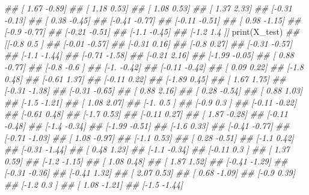 \documentclass[
]{book}
\newenvironment{Shaded}{\begin{snugshade}}{\end{snugshade}}
\newcommand{\BuiltInTok}[1]{#1}
\newcommand{\CommentTok}[1]{\textcolor[rgb]{0.56,0.35,0.01}{\textit{#1}}}
\newcommand{\NormalTok}[1]{#1}
\theoremstyle{definition}
\theoremstyle{definition}
\theoremstyle{definition}
\theoremstyle{definition}
\theoremstyle{remark}
\begin{document}
\begin{Shaded}
\begin{Highlighting}[]
\CommentTok{\#\#  [ 1.67 {-}0.89]}
\CommentTok{\#\#  [ 1.18  0.53]}
\CommentTok{\#\#  [ 1.08  0.53]}
\CommentTok{\#\#  [ 1.37  2.33]}
\CommentTok{\#\#  [{-}0.31 {-}0.13]}
\CommentTok{\#\#  [ 0.38 {-}0.45]}
\CommentTok{\#\#  [{-}0.41 {-}0.77]}
\CommentTok{\#\#  [{-}0.11 {-}0.51]}
\CommentTok{\#\#  [ 0.98 {-}1.15]}
\CommentTok{\#\#  [{-}0.9  {-}0.77]}
\CommentTok{\#\#  [{-}0.21 {-}0.51]}
\CommentTok{\#\#  [{-}1.1  {-}0.45]}
\CommentTok{\#\#  [{-}1.2   1.4 ]]}
\BuiltInTok{print}\NormalTok{(X\_test)}
\CommentTok{\#\# [[{-}0.8   0.5 ]}
\CommentTok{\#\#  [{-}0.01 {-}0.57]}
\CommentTok{\#\#  [{-}0.31  0.16]}
\CommentTok{\#\#  [{-}0.8   0.27]}
\CommentTok{\#\#  [{-}0.31 {-}0.57]}
\CommentTok{\#\#  [{-}1.1  {-}1.44]}
\CommentTok{\#\#  [{-}0.71 {-}1.58]}
\CommentTok{\#\#  [{-}0.21  2.16]}
\CommentTok{\#\#  [{-}1.99 {-}0.05]}
\CommentTok{\#\#  [ 0.88 {-}0.77]}
\CommentTok{\#\#  [{-}0.8  {-}0.6 ]}
\CommentTok{\#\#  [{-}1.   {-}0.42]}
\CommentTok{\#\#  [{-}0.11 {-}0.42]}
\CommentTok{\#\#  [ 0.09  0.22]}
\CommentTok{\#\#  [{-}1.8   0.48]}
\CommentTok{\#\#  [{-}0.61  1.37]}
\CommentTok{\#\#  [{-}0.11  0.22]}
\CommentTok{\#\#  [{-}1.89  0.45]}
\CommentTok{\#\#  [ 1.67  1.75]}
\CommentTok{\#\#  [{-}0.31 {-}1.38]}
\CommentTok{\#\#  [{-}0.31 {-}0.65]}
\CommentTok{\#\#  [ 0.88  2.16]}
\CommentTok{\#\#  [ 0.28 {-}0.54]}
\CommentTok{\#\#  [ 0.88  1.03]}
\CommentTok{\#\#  [{-}1.5  {-}1.21]}
\CommentTok{\#\#  [ 1.08  2.07]}
\CommentTok{\#\#  [{-}1.    0.5 ]}
\CommentTok{\#\#  [{-}0.9   0.3 ]}
\CommentTok{\#\#  [{-}0.11 {-}0.22]}
\CommentTok{\#\#  [{-}0.61  0.48]}
\CommentTok{\#\#  [{-}1.7   0.53]}
\CommentTok{\#\#  [{-}0.11  0.27]}
\CommentTok{\#\#  [ 1.87 {-}0.28]}
\CommentTok{\#\#  [{-}0.11 {-}0.48]}
\CommentTok{\#\#  [{-}1.4  {-}0.34]}
\CommentTok{\#\#  [{-}1.99 {-}0.51]}
\CommentTok{\#\#  [{-}1.6   0.33]}
\CommentTok{\#\#  [{-}0.41 {-}0.77]}
\CommentTok{\#\#  [{-}0.71 {-}1.03]}
\CommentTok{\#\#  [ 1.08 {-}0.97]}
\CommentTok{\#\#  [{-}1.1   0.53]}
\CommentTok{\#\#  [ 0.28 {-}0.51]}
\CommentTok{\#\#  [{-}1.1   0.42]}
\CommentTok{\#\#  [{-}0.31 {-}1.44]}
\CommentTok{\#\#  [ 0.48  1.23]}
\CommentTok{\#\#  [{-}1.1  {-}0.34]}
\CommentTok{\#\#  [{-}0.11  0.3 ]}
\CommentTok{\#\#  [ 1.37  0.59]}
\CommentTok{\#\#  [{-}1.2  {-}1.15]}
\CommentTok{\#\#  [ 1.08  0.48]}
\CommentTok{\#\#  [ 1.87  1.52]}
\CommentTok{\#\#  [{-}0.41 {-}1.29]}
\CommentTok{\#\#  [{-}0.31 {-}0.36]}
\CommentTok{\#\#  [{-}0.41  1.32]}
\CommentTok{\#\#  [ 2.07  0.53]}
\CommentTok{\#\#  [ 0.68 {-}1.09]}
\CommentTok{\#\#  [{-}0.9   0.39]}
\CommentTok{\#\#  [{-}1.2   0.3 ]}
\CommentTok{\#\#  [ 1.08 {-}1.21]}
\CommentTok{\#\#  [{-}1.5  {-}1.44]}

\end{Highlighting}
\end{Shaded}
\end{document}
